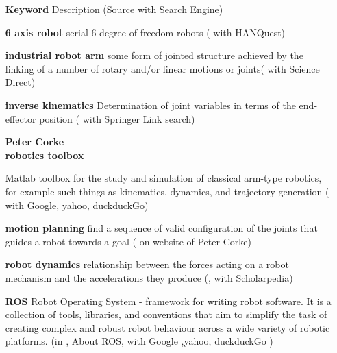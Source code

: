 \begin{itemize} [leftmargin=3cm]
	\item[\textbf{Keyword}] Description (Source with Search Engine)
	\item [\textbf{6 axis robot}] serial 6 degree of freedom robots (\cite{6axisRobot} with HANQuest)
	\item [\textbf{industrial robot arm}]  some form of jointed structure  achieved by the linking of a number of rotary and/or linear motions or \gls{joints}( \cite{IndustrialRobotArm} with Science Direct)
	\item [\textbf{inverse kinematics}] Determination of joint variables in terms of the end-effector position 
	(\cite{Jazar2007} with Springer Link search)
	\item[{\parbox[t]{0.25\linewidth}{\raggedright\textbf{Peter Corke \\ robotics toolbox}}}] \parbox[t]{1\linewidth}{Matlab toolbox for the study and simulation of classical arm-type robotics, for example such things as kinematics, dynamics, and  trajectory generation (\cite{CorkeRoboticsToolbox} with Google, yahoo, duckduckGo)}
	\item [\textbf{motion planning}]  find a sequence of valid configuration of the \gls{joints} that  guides a robot towards a goal (\cite{CorkeRoboticVisionControl} on website of Peter Corke)
	\item [\textbf{robot dynamics}] relationship between the forces acting on a robot mechanism and the accelerations they produce (\cite{RobotDynamics}, with Scholarpedia)
	\item [\textbf{ROS}] Robot Operating System - framework for writing robot software. It is a collection of tools, libraries, and conventions that aim to simplify the task of creating complex and robust robot behaviour across a wide variety of robotic platforms. (in \cite{ROS}, About ROS, with Google ,yahoo, duckduckGo ) 
\end{itemize} 
\medskip

